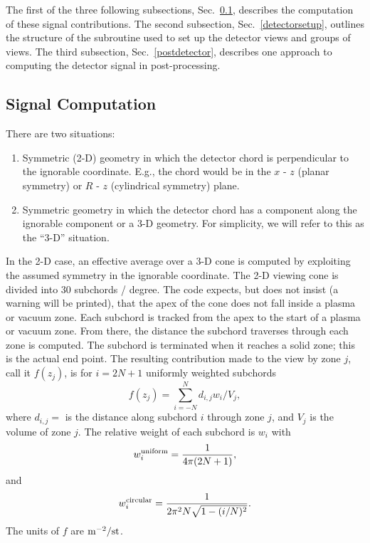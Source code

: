 \documentclass[12pt]{report}
\begin{document}
The first of the three following subsections, Sec.~\ref{frags}, describes
the computation of these signal contributions.  The second subsection,
Sec.~\ref{detectorsetup}, outlines the structure of the subroutine
used to set up the detector views and groups of views.  The third
subsection, Sec.~\ref{postdetector}, describes one approach to
computing the detector signal in post-processing.

\subsection{Signal Computation}
\label{frags}

There are two situations:
\begin{enumerate}
  \item Symmetric (2-D) geometry in which the detector chord
is perpendicular to the ignorable coordinate.  E.g., the
chord would be in the $x$ - $z$ (planar symmetry) or $R$ - $z$
(cylindrical symmetry) plane.
  \item Symmetric geometry in which the detector chord has a
component along the ignorable component or a 3-D geometry.
For simplicity, we will refer to this as the ``3-D'' situation.
\end{enumerate}

In the 2-D case, an effective average over a 3-D cone is computed
by exploiting the assumed symmetry in the ignorable coordinate.
The 2-D viewing cone is divided into 30 subchords / degree. The code
expects, but does not insist (a warning will be printed), 
that the apex of the cone does not
fall inside a plasma or vacuum zone. Each subchord is tracked from the
apex to the start of a plasma or vacuum zone. From there, the distance
the subchord traverses through each zone is computed. The subchord is
terminated when it reaches a solid zone; this is the actual end point.
The resulting contribution made to the view by zone $j$, call it $f(z_{j})$,
is for $i = 2N+1$
uniformly weighted subchords
\begin{equation}
f(z_{j}) = \sum_{i=-N}^{N}  d_{i,j} w_{i} / V_{j},
\label{zonefrag}
\end{equation}
where $d_{i,j} = $ is the distance along subchord $i$ through zone $j$, 
and $V_{j}$ is the volume of zone $j$.  The relative weight of each
subchord is $w_{i}$ with
\begin{equation}
w_{i}^{\rm uniform} = \frac{1}{4 \pi (2N + 1)},
\end{equation}
and
\begin{equation}
w_{i}^{\rm circular} = \frac{1}{2 \pi^{2} N \sqrt{1 - (i/N)^2}}.
\end{equation}
The units of $f$ are ${\rm m}^{-2}/{\rm st}$.
\end{document}
